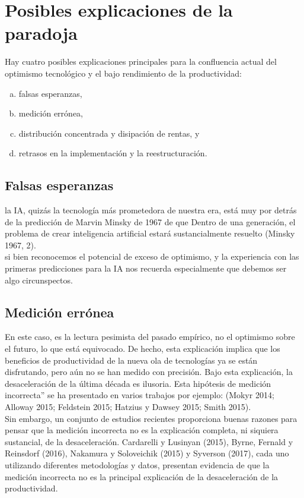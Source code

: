 \section{Posibles explicaciones de la paradoja}
Hay cuatro posibles explicaciones principales para la confluencia actual del optimismo tecnológico y el bajo rendimiento de la productividad: 

\begin{enumerate}[(a)]
    \item falsas esperanzas, 
    \item medición errónea, 
    \item distribución concentrada y disipación de rentas, y 
    \item retrasos en la implementación y la reestructuración.
\end{enumerate}

    \subsection{Falsas esperanzas}
    la IA, quizás la tecnología más prometedora de nuestra era, está muy por detrás de la predicción de Marvin Minsky de 1967 de que Dentro de una generación, el problema de crear inteligencia artificial estará sustancialmente resuelto (Minsky 1967, 2).\\
    si bien reconocemos el potencial de exceso de optimismo, y la experiencia con las primeras predicciones para la IA nos recuerda especialmente que debemos ser algo circunspectos.

    \subsection{Medición errónea}
    En este caso, es la lectura pesimista del pasado empírico, no el optimismo sobre el futuro, lo que está equivocado. De hecho, esta explicación implica que los beneficios de productividad de la nueva ola de tecnologías ya se están disfrutando, pero aún no se han medido con precisión. Bajo esta explicación, la desaceleración de la última década es ilusoria. Esta hipótesis de medición incorrecta” se ha presentado en varios trabajos por ejemplo: (Mokyr 2014; Alloway 2015; Feldstein 2015; Hatzius y Dawsey 2015; Smith 2015).\\
    Sin embargo, un conjunto de estudios recientes proporciona buenas razones para pensar que la medición incorrecta no es la explicación completa, ni siquiera sustancial, de la desaceleración. Cardarelli y Lusinyan (2015), Byrne, Fernald y Reinsdorf (2016), Nakamura y Soloveichik (2015) y Syverson (2017), cada uno utilizando diferentes metodologías y datos, presentan evidencia de que la medición incorrecta no es la principal explicación de la desaceleración de la productividad.

